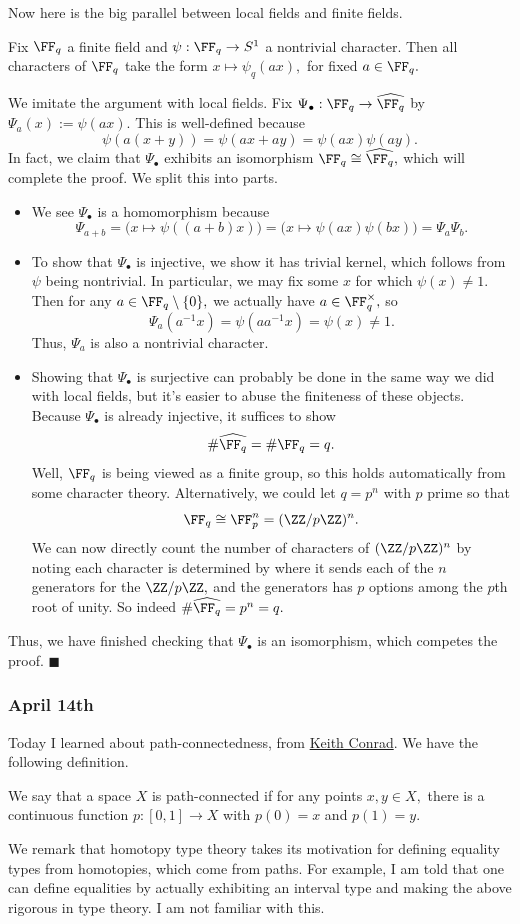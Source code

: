 Now here is the big parallel between local fields and finite fields.
\begin{lemma}
    Fix $\FF_q$ a finite field and $\psi:\FF_q\to S^1$ a nontrivial character. Then all characters of $\FF_q$ take the form $x\mapsto\psi_q(ax),$ for fixed $a\in\FF_q.$
\end{lemma}
We imitate the argument with local fields. Fix $\Psi_\bullet:\FF_q\to\widehat{\FF_q}$ by $\Psi_a(x):=\psi(ax).$ This is well-defined because
\[\psi(a(x+y))=\psi(ax+ay)=\psi(ax)\psi(ay).\]
In fact, we claim that $\Psi_\bullet$ exhibits an isomorphism $\FF_q\cong\widehat{\FF_q},$ which will complete the proof. We split this into parts.
\begin{itemize}
    \item We see $\Psi_\bullet$ is a homomorphism because
    \[\Psi_{a+b}=\big(x\mapsto\psi((a+b)x)\big)=\big(x\mapsto\psi(ax)\psi(bx)\big)=\Psi_a\Psi_b.\]
    \item To show that $\Psi_\bullet$ is injective, we show it has trivial kernel, which follows from $\psi$ being nontrivial. In particular, we may fix some $x$ for which $\psi(x)\ne1.$ Then for any $a\in\FF_q\setminus\{0\},$ we actually have $a\in\FF_q^\times,$ so
    \[\Psi_a\left(a^{-1}x\right)=\psi\left(aa^{-1}x\right)=\psi(x)\ne1.\]
    Thus, $\Psi_a$ is also a nontrivial character.
    \item Showing that $\Psi_\bullet$ is surjective can probably be done in the same way we did with local fields, but it's easier to abuse the finiteness of these objects. Because $\Psi_\bullet$ is already injective, it suffices to show
    \[\#\widehat{\FF_q}=\#\FF_q=q.\]
    Well, $\FF_q$ is being viewed as a finite group, so this holds automatically from some character theory. Alternatively, we could let $q=p^n$ with $p$ prime so that
    \[\FF_q\cong\FF_p^n=(\ZZ/p\ZZ)^n.\]
    We can now directly count the number of characters of $(\ZZ/p\ZZ)^n$ by noting each character is determined by where it sends each of the $n$ generators for the $\ZZ/p\ZZ,$ and the generators has $p$ options among the $p$th root of unity. So indeed $\#\widehat{\FF_q}=p^n=q.$
\end{itemize}
Thus, we have finished checking that $\Psi_\bullet$ is an isomorphism, which competes the proof. $\blacksquare$

\subsubsection{April 14th}
Today I learned about path-connectedness, from \href{https://web.archive.org/web/20210413174048/https://kconrad.math.uconn.edu/blurbs/topology/connnotpathconn.pdf}{Keith Conrad}. We have the following definition.
\begin{definition}
    We say that a space $X$ is path-connected if for any points $x,y\in X,$ there is a continuous function $p:[0,1]\to X$ with $p(0)=x$ and $p(1)=y.$
\end{definition}
We remark that homotopy type theory takes its motivation for defining equality types from homotopies, which come from paths. For example, I am told that one can define equalities by actually exhibiting an interval type and making the above rigorous in type theory. I am not familiar with this.

